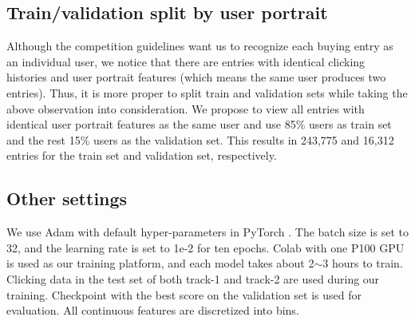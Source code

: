\subsection{Train/validation split by user portrait}
Although the competition guidelines want us to recognize each buying entry as an individual user, we notice that there are entries with identical clicking histories and user portrait features (which means the same user produces two entries).
Thus, it is more proper to split train and validation sets while taking the above observation into consideration.
We propose to view all entries with identical user portrait features as the same user and use 85\% users as train set and the rest 15\% users as the validation set.
This results in 243,775 and 16,312 entries for the train set and validation set, respectively.


\subsection{Other settings}
We use Adam \cite{adam} with default hyper-parameters in PyTorch \cite {pytorch}.
The batch size is set to 32, and the learning rate is set to 1e-2 for ten epochs.
Colab with one P100 GPU is used as our training platform, and each model takes about 2$\sim$3 hours to train.
%
Clicking data in the test set of both track-1 and track-2 are used during our training. 
%
Checkpoint with the best score on the validation set is used for evaluation.
%
All continuous features are discretized into bins.



